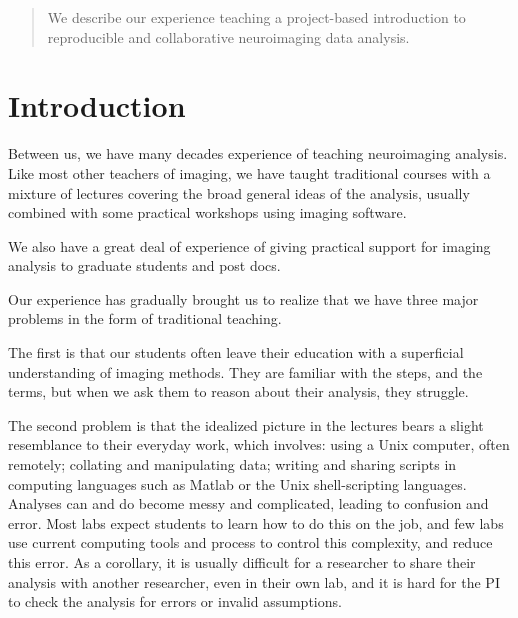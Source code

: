 \maketitle

\wordcount

\begin{abstract} %
We describe our experience teaching a project-based introduction to
reproducible and collaborative neuroimaging data analysis.

\tiny
\end{abstract}

\section{Introduction}

Between us, we have many decades experience of teaching neuroimaging analysis.
Like most other teachers of imaging, we have taught traditional courses with a
mixture of lectures covering the broad general ideas of the analysis, usually
combined with some practical workshops using imaging software.

We also have a great deal of experience of giving practical support for
imaging analysis to graduate students and post docs.

Our experience has gradually brought us to realize that we have three major
problems in the form of traditional teaching.

The first is that our students often leave their education with a superficial
understanding of imaging methods.  They are familiar with the steps, and the
terms, but when we ask them to reason about their analysis, they struggle.

The second problem is that the idealized picture in the lectures bears a
slight resemblance to their everyday work, which involves: using a Unix
computer, often remotely; collating and manipulating data; writing and sharing
scripts in computing languages such as Matlab or the Unix shell-scripting
languages.  Analyses can and do become messy and complicated, leading to
confusion and error.  Most labs expect students to learn how to do this on the
job, and few labs use current computing tools and process to control this
complexity, and reduce this error.  As a corollary, it is usually
difficult for a researcher to share their analysis with another
researcher, even in their own lab, and it is hard for the PI to check the
analysis for errors or invalid assumptions.

